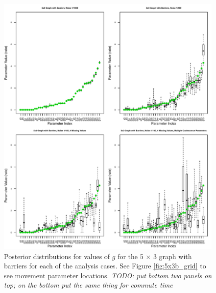 \documentclass{article}
\newcommand{\plr}[1]{{\em \color{blue} #1}}
\begin{document}
\begin{figure}
\centering
     \includegraphics[scale=0.8]{figs/5x3boxplots}
    \caption{Posterior distributions for values of $g$ 
    for the 5 $\times$ 3 graph with barriers 
    for each of the analysis cases.
    See Figure \ref{fig:5x3b_grid} to see movement parameter locations.
    \plr{TODO: put bottom two panels on top; on the bottom put the same thing for commute time}
}
    \label{fig:5x3boxplots_mult_gam}
\end{figure}
\end{document}
